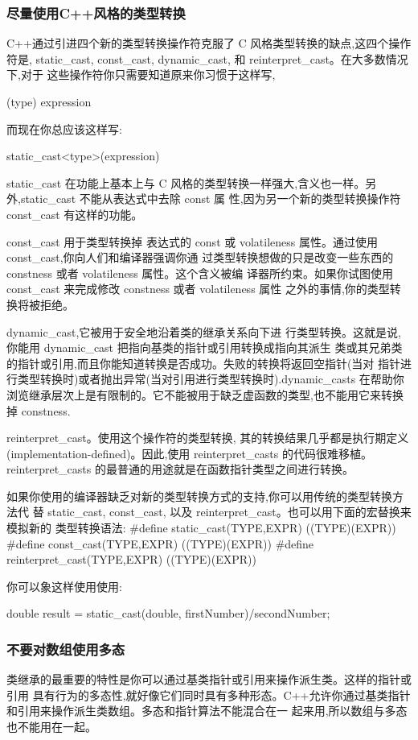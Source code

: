 \subsubsection{尽量使用C++风格的类型转换}
C++通过引进四个新的类型转换操作符克服了 C 风格类型转换的缺点,这四个操作符是, static_cast, const_cast, dynamic_cast, 和 reinterpret_cast。在大多数情况下,对于 这些操作符你只需要知道原来你习惯于这样写,

(type) expression 

而现在你总应该这样写: 

static_cast<type>(expression)

static_cast 在功能上基本上与 C 风格的类型转换一样强大,含义也一样。另外,static_cast 不能从表达式中去除 const 属 性,因为另一个新的类型转换操作符 const_cast 有这样的功能。

const_cast 用于类型转换掉 表达式的 const 或 volatileness 属性。通过使用 const_cast,你向人们和编译器强调你通 过类型转换想做的只是改变一些东西的 constness 或者 volatileness 属性。这个含义被编 译器所约束。如果你试图使用 const_cast 来完成修改 constness 或者 volatileness 属性 之外的事情,你的类型转换将被拒绝。

dynamic_cast,它被用于安全地沿着类的继承关系向下进 行类型转换。这就是说,你能用 dynamic_cast 把指向基类的指针或引用转换成指向其派生 类或其兄弟类的指针或引用,而且你能知道转换是否成功。失败的转换将返回空指针(当对 指针进行类型转换时)或者抛出异常(当对引用进行类型转换时).dynamic_casts 在帮助你浏览继承层次上是有限制的。它不能被用于缺乏虚函数的类型,也不能用它来转换掉 constness.

reinterpret_cast。使用这个操作符的类型转换, 其的转换结果几乎都是执行期定义(implementation-defined)。因此,使用 reinterpret_casts 的代码很难移植。
reinterpret_casts 的最普通的用途就是在函数指针类型之间进行转换。

如果你使用的编译器缺乏对新的类型转换方式的支持,你可以用传统的类型转换方法代 替 static_cast, const_cast, 以及 reinterpret_cast。也可以用下面的宏替换来模拟新的 类型转换语法:
\#define static_cast(TYPE,EXPR) ((TYPE)(EXPR)) 
\#define const_cast(TYPE,EXPR) ((TYPE)(EXPR)) 
\#define reinterpret_cast(TYPE,EXPR) ((TYPE)(EXPR)) 

你可以象这样使用使用:

double result = static_cast(double, firstNumber)/secondNumber;

\subsubsection{不要对数组使用多态}
类继承的最重要的特性是你可以通过基类指针或引用来操作派生类。这样的指针或引用 具有行为的多态性,就好像它们同时具有多种形态。C++允许你通过基类指针和引用来操作派生类数组。多态和指针算法不能混合在一 起来用,所以数组与多态也不能用在一起。

